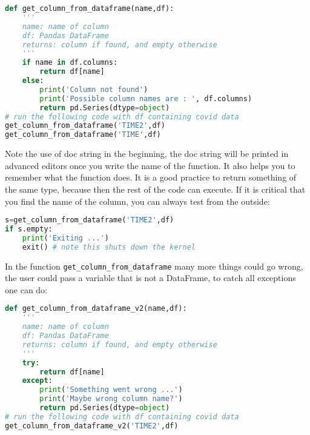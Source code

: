 \documentclass[graybox,sectrefs,envcountresetchap,open=right,final]{svmonodo}
\begin{document}
\begin{lstlisting}[language=python,style=blue1bar]
def get_column_from_dataframe(name,df):
    '''
    name: name of column
    df: Pandas DataFrame
    returns: column if found, and empty otherwise 
    '''
    if name in df.columns:
        return df[name]
    else:
        print('Column not found')
        print('Possible column names are : ', df.columns)
        return pd.Series(dtype=object)
# run the following code with df containing covid data
get_column_from_dataframe('TIME2',df)
get_column_from_dataframe('TIME',df)

\end{lstlisting}

Note the use of doc string in the beginning, the doc string will be printed in advanced editors once you write the name of the function. It also helps you to remember what the function does. It is a good practice to return something of the same type, because then the rest of the code can execute. If it is critical that you find the name of the column, you can always test from the outside:





\begin{lstlisting}[language=python,style=blue1bar]
s=get_column_from_dataframe('TIME2',df)
if s.empty:
    print('Exiting ...')
    exit() # note this shuts down the kernel

\end{lstlisting}

In the function \Verb!get_column_from_dataframe! many more things could go wrong, the user could pass a variable that is not a DataFrame, to catch all exceptions one can do:















\begin{lstlisting}[language=python,style=blue1bar]
def get_column_from_dataframe_v2(name,df):
    '''
    name: name of column
    df: Pandas DataFrame
    returns: column if found, and empty otherwise 
    '''
    try:
        return df[name]
    except:
        print('Something went wrong ...')
        print('Maybe wrong column name?')
        return pd.Series(dtype=object)
# run the following code with df containing covid data
get_column_from_dataframe_v2('TIME2',df)

\end{lstlisting}
\end{document}
